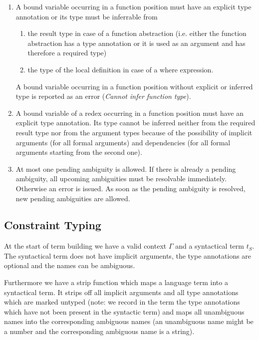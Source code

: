 \begin{enumerate}

\item A bound variable occurring in a function position must have an explicit
type annotation or its type must be inferrable from

    \begin{enumerate}

    \item the result type in case of a function abstraction (i.e. either the
    function abstraction has a type annotation or it is used as an argument and
    has therefore a required type)

    \item the type of the local definition in case of a where expression.
    \end{enumerate}

A bound variable occurring in a function position without explicit or inferred
type is reported as an error ({\em Cannot infer function type}).

\item A bound variable of a redex occurring in a function position must have an
explicit type annotation. Its type cannot be inferred neither from the required
result type nor from the argument types because of the possibility of implicit
arguments (for all formal arguments) and dependencies (for all formal arguments
starting from the second one).

\item At most one pending ambiguity is allowed. If there is already a pending
ambiguity, all upcoming ambiguities must be resolvable immediately. Otherwise an
error is issued. As soon as the pending ambiguity is resolved, new pending
ambiguities are allowed.

\end{enumerate}








\subsection{Constraint Typing}

At the start of term building we have a valid context $\Gamma$ and a syntactical
term $t_S$. The syntactical term does not have implicit arguments, the type
annotations are optional and the names can be ambiguous.

Furthermore we have a strip function which maps a language term into a
syntactical term. It strips off all implicit arguments and all type annotations
which are marked untyped (note: we record in the term the type annotations which
have not been present in the syntactic term) and maps all unambiguous names into
the corresponding ambiguous names (an unambiguous name might be a number and the
corresponding ambiguous name is a string).


